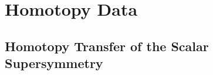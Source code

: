 \documentclass[10pt, oneside]{article}
\begin{document}
\section{Homotopy Data}

\subsection{Homotopy Transfer of the Scalar Supersymmetry}



\pagestyle{bib}
\printbibliography
\end{document}
